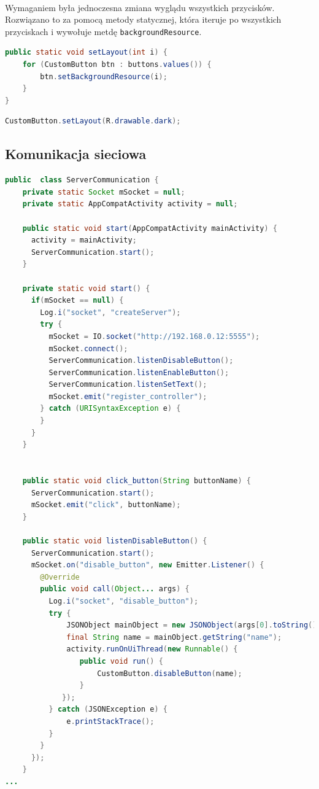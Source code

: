 \paragraph{}
Wymaganiem była jednoczesna zmiana wyglądu wszystkich przycisków. Rozwiązano to za pomocą metody statycznej, która iteruje po wszystkich przyciskach i wywołuje metdę \texttt{backgroundResource}.


\begin{lstlisting}[language=Java]
 public static void setLayout(int i) {
    for (CustomButton btn : buttons.values()) {
        btn.setBackgroundResource(i);
    }
}
\end{lstlisting}


\begin{lstlisting}[language=Java]
CustomButton.setLayout(R.drawable.dark);
\end{lstlisting}

\subsection{Komunikacja sieciowa}

\begin{lstlisting}[language=Java]
public  class ServerCommunication {
    private static Socket mSocket = null;
    private static AppCompatActivity activity = null;

    public static void start(AppCompatActivity mainActivity) {
      activity = mainActivity;
      ServerCommunication.start();
    }

    private static void start() {
      if(mSocket == null) {
        Log.i("socket", "createServer");
        try {
          mSocket = IO.socket("http://192.168.0.12:5555");
          mSocket.connect();
          ServerCommunication.listenDisableButton();
          ServerCommunication.listenEnableButton();
          ServerCommunication.listenSetText();
          mSocket.emit("register_controller");
        } catch (URISyntaxException e) {
        }
      }
    }


    public static void click_button(String buttonName) {
      ServerCommunication.start();
      mSocket.emit("click", buttonName);
    }

    public static void listenDisableButton() {
      ServerCommunication.start();
      mSocket.on("disable_button", new Emitter.Listener() {
        @Override
        public void call(Object... args) {
          Log.i("socket", "disable_button");
          try {
              JSONObject mainObject = new JSONObject(args[0].toString());
              final String name = mainObject.getString("name");
              activity.runOnUiThread(new Runnable() {
                 public void run() {
                     CustomButton.disableButton(name);
                 }
             });
          } catch (JSONException e) {
              e.printStackTrace();
          }
        }
      });
    }
...
\end{lstlisting}

